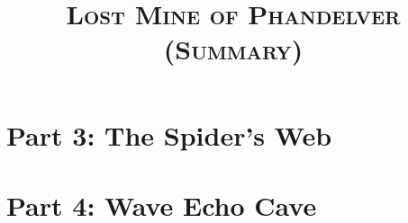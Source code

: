 \documentclass{article}
\title{\textsc{\Huge Lost Mine of Phandelver (Summary)}}
\date{ }
\begin{document}
	\maketitle
	\tableofcontents
	\pagebreak
	\begin{multicols}{2}

	
	\vfill
	\pagebreak
	
	\vfill
	\pagebreak
	
	\vfill
	\pagebreak


	
	\section{Part 3: The Spider's Web}
	\section{Part 4: Wave Echo Cave}
	
	\end{multicols}
	
\end{document}
